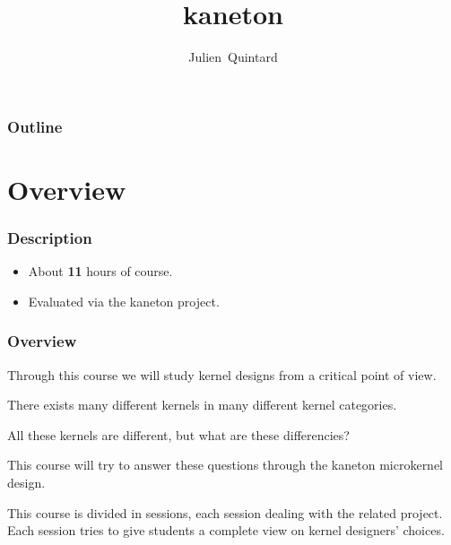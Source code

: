 
%
%



%
%

\title{kaneton}

%
%

\author
{
  Julien~Quintard
}

%
%



%
%

\begin{frame}
  \titlepage

  \begin{center}
    \logos
  \end{center}
\end{frame}

%
%

\begin{frame}
  \frametitle{Outline}
  \tableofcontents
\end{frame}

%
%

\section{Overview}


\begin{frame}
  \frametitle{Description}

  \begin{itemize}
    \item
      About \textbf{11} hours of course.
    \item
      Evaluated via the kaneton project.
  \end{itemize}
\end{frame}


\begin{frame}
  \frametitle{Overview}

  Through this course we will study kernel designs from a critical
  point of view.

  \nl

  There exists many different kernels in many different kernel categories.

  \nl

  All these kernels are different, but what are these differencies?

  \nl

  This course will try to answer these questions through the
  kaneton microkernel design.

  \nl

  This course is divided in sessions, each session dealing with the
  related project. Each session tries to give students a complete view
  on kernel designers' choices.
\end{frame}

